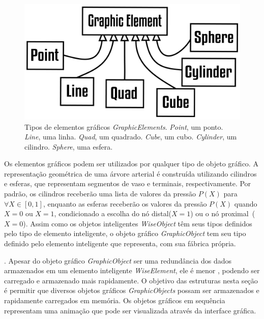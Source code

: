 \begin{figure}[!htbp]
	\centering
	\includegraphics[scale=2]{Figures/GraphicElements@16x.png}
	\caption{Tipos de elementos gráficos \textit{GraphicElements}. \textit{Point}, um ponto. \textit{Line}, uma linha. \textit{Quad}, um quadrado. \textit{Cube}, um cubo. \textit{Cylinder}, um cilindro. \textit{Sphere}, uma esfera.}
	\label{fig7:graphicelements}
\end{figure}

Os elementos gráficos podem ser utilizados por qualquer tipo de objeto gráfico. A representação geométrica de uma árvore arterial é construída utilizando cilindros e esferas, que representam segmentos de vaso e terminais, respectivamente. Por padrão, os cilindros receberão uma lista de valores da pressão $P(X)$ para $\forall X \in [0,1]$, enquanto as esferas receberão os valores da pressão $P(X)$ quando $X=0$ ou $X=1$, condicionado a escolha do nó distal($X=1$) ou o nó proximal~($X=0$).  Assim como os objetos inteligentes \textit{WiseObject} têm seus tipos definidos pelo tipo de elemento inteligente, o objeto gráfico \textit{GraphicObject} tem seu tipo definido pelo elemento inteligente que representa, com sua fábrica própria.

. Apesar do objeto gráfico \textit{GraphicObject} ser uma redundância dos dados armazenados em um elemento inteligente \textit{WiseElement}, ele é menor , podendo ser carregado e armazenado mais rapidamente. O objetivo das estruturas nesta seção é permitir que diversos objetos gráficos \textit{GraphicObjects} possam ser armazenados  e rapidamente carregados em memória. Os objetos gráficos em sequência representam uma animação que pode ser visualizada através da interface gráfica. 


